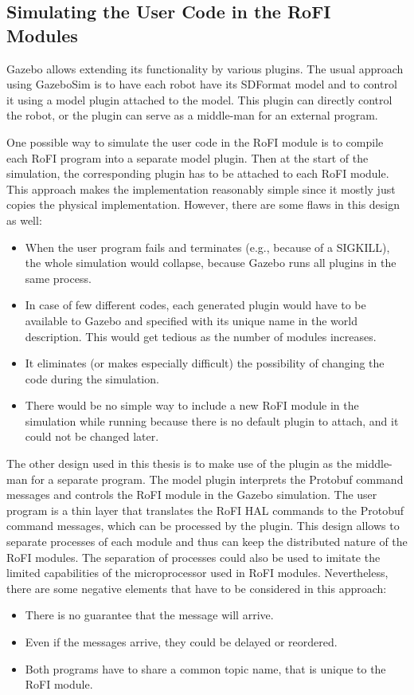 \documentclass[
  printed, %
  color,   %
  notable, %
  oneside, %
  nolof,   %
  nolot,   %
  nocover,
]{fithesis3}
\begin{document}
\subsection{Simulating the User Code in the RoFI Modules}

Gazebo allows extending its functionality by various plugins.
The usual approach using GazeboSim is to have each robot have its SDFormat model and to control it using a model plugin attached to the model.
This plugin can directly control the robot, or the plugin can serve as a middle-man for an external program.

One possible way to simulate the user code in the RoFI module is to compile each RoFI program into a separate model plugin.
Then at the start of the simulation, the corresponding plugin has to be attached to each RoFI module.
This approach makes the implementation reasonably simple since it mostly just copies the physical implementation.
However, there are some flaws in this design as well:
\begin{itemize}
    \item When the user program fails and terminates (e.g., because of a SIGKILL), the whole simulation would collapse, because Gazebo runs all plugins in the same process.
    \item In case of few different codes, each generated plugin would have to be available to Gazebo and specified with its unique name in the world description.
    This would get tedious as the number of modules increases.
    \item It eliminates (or makes especially difficult) the possibility of changing the code during the simulation.
    \item There would be no simple way to include a new RoFI module in the simulation while running because there is no default plugin to attach, and it could not be changed later.
\end{itemize}

The other design used in this thesis is to make use of the plugin as the middle-man for a separate program.
The model plugin interprets the Protobuf command messages and controls the RoFI module in the Gazebo simulation.
The user program\label{user-program} is a thin layer that translates the RoFI HAL commands to the Protobuf command messages, which can be processed by the plugin.
This design allows to separate processes of each module and thus can keep the distributed nature of the RoFI modules.
The separation of processes could also be used to imitate the limited capabilities of the microprocessor used in RoFI modules.
Nevertheless, there are some negative elements that have to be considered in this approach:
\begin{itemize}
    \item There is no guarantee that the message will arrive.
    \item Even if the messages arrive, they could be delayed or reordered.
    \item Both programs have to share a common topic name, that is unique to the RoFI module.
\end{itemize}
\end{document}
